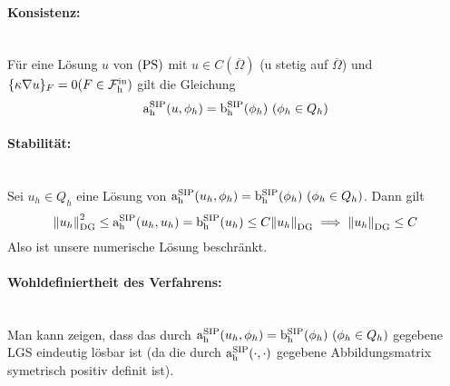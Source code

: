 \paragraph{Konsistenz:}~\\
Für eine Lösung $ u $ von $ \operatorname{(PS)} $ mit $ u \in C(\overline{\Omega}) $ (u stetig auf $ \overline{\Omega} $) und  \textcolor{red}{$ \{\kappa \nabla u\}_F =0 (F \in \operatorname{\mathcal{F}_h^{\text{in}}})$}
gilt die Gleichung
\[ \operatorname{a_h^{\text{SIP}}}(u,\phi_h) = \operatorname{b_h^{\text{SIP}}}(\phi_h) \ (\phi_h \in Q_h) \]

\paragraph{Stabilität:}~\\
Sei $ u_h \in Q_h $ eine Lösung von $ \operatorname{a_h^{\text{SIP}}}(u_h, \phi_h) = \operatorname{b_h^{\text{SIP}}}(\phi_h) \ (\phi_h \in Q_h) $. Dann gilt
\[ \norm{u_h}_{\text{DG}}^2 \le \operatorname{a_h^{\text{SIP}}}(u_h, u_h) = \operatorname{b_h^{\text{SIP}}}(u_h) \le C \norm{u_h}_{\text{DG}} \implies \norm{u_h}_{\text{DG}} \le C \]
Also ist unsere numerische Lösung beschränkt. 

\paragraph{Wohldefiniertheit des Verfahrens:}~\\
Man kann zeigen, dass das durch $ \operatorname{a_h^{\text{SIP}}}(u_h, \phi_h) = \operatorname{b_h^{\text{SIP}}}(\phi_h) \ (\phi_h \in Q_h) $ gegebene LGS eindeutig lösbar ist (da die durch $ \operatorname{a_h^{\text{SIP}}}(\cdot, \cdot)  $ gegebene Abbildungsmatrix symetrisch positiv definit ist).